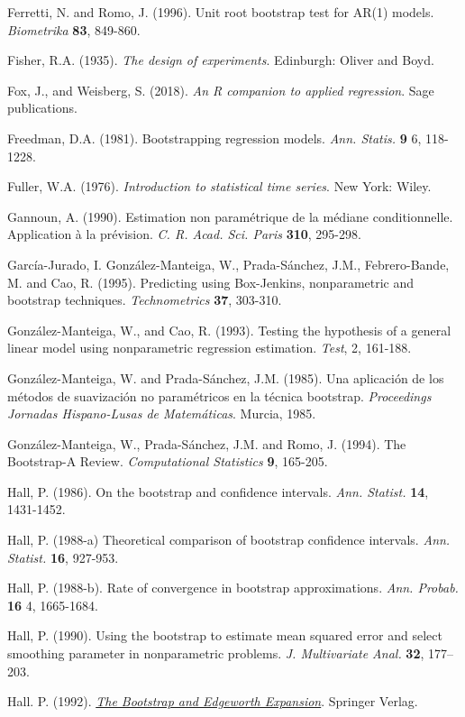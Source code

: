 \documentclass[
]{book}
\theoremstyle{break}
\theoremstyle{definition}
\theoremstyle{definition}
\theoremstyle{definition}
\theoremstyle{remark}
\begin{document}
Ferretti, N. and Romo, J. (1996). Unit root bootstrap test for AR(1)
models. \emph{Biometrika} \textbf{83}, 849-860.

Fisher, R.A. (1935). \emph{The design of experiments}. Edinburgh: Oliver and Boyd.

Fox, J., and Weisberg, S. (2018). \emph{An R companion to applied regression}. Sage publications.

Freedman, D.A. (1981). Bootstrapping regression models.
\emph{Ann. Statis.} \textbf{9} 6, 118-1228.

Fuller, W.A. (1976). \emph{Introduction to statistical time series}. New York:
Wiley.

Gannoun, A. (1990). Estimation non paramétrique de la médiane
conditionnelle. Application à la prévision. \emph{C. R. Acad. Sci. Paris}
\textbf{310}, 295-298.

García-Jurado, I. González-Manteiga, W., Prada-Sánchez, J.M.,
Febrero-Bande, M. and Cao, R. (1995). Predicting using Box-Jenkins,
nonparametric and bootstrap techniques. \emph{Technometrics} \textbf{37}, 303-310.

González-Manteiga, W., and Cao, R. (1993). Testing the hypothesis of a general linear model using nonparametric regression estimation. \emph{Test}, 2, 161-188.

González-Manteiga, W. and Prada-Sánchez, J.M. (1985). Una aplicación de
los métodos de suavización no paramétricos en la técnica bootstrap.
\emph{Proceedings Jornadas Hispano-Lusas de Matemáticas}. Murcia, 1985.

González-Manteiga, W., Prada-Sánchez, J.M. and Romo, J. (1994). The
Bootstrap-A Review. \emph{Computational Statistics} \textbf{9}, 165-205.

Hall, P. (1986). On the bootstrap and confidence intervals.
\emph{Ann. Statist.} \textbf{14}, 1431-1452.

Hall, P. (1988-a) Theoretical comparison of bootstrap confidence
intervals. \emph{Ann. Statist.} \textbf{16}, 927-953.

Hall, P. (1988-b). Rate of convergence in bootstrap approximations.
\emph{Ann. Probab.} \textbf{16} 4, 1665-1684.

Hall, P. (1990). Using the bootstrap to estimate mean squared error and
select smoothing parameter in nonparametric problems.
\emph{J. Multivariate Anal.} \textbf{32}, 177--203.

Hall. P. (1992). \href{https://books.google.es/books?hl=es\&lr=\&id=CwLaBwAAQBAJ\&oi=fnd\&pg=PR11\&dq=The+Bootstrap+and+Edgeworth+Expansion}{\emph{The Bootstrap and Edgeworth Expansion}}. Springer Verlag.
\end{document}
